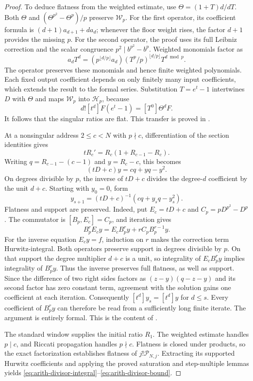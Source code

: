\begin{proof}
To deduce flatness from the weighted estimate, use
$\Theta=(1+T)d/dT$.  Both $\Theta$ and
$(\Theta^{p^2}-\Theta^p)/p$ preserve $\mathcal W_p$.
For the first operator, its coefficient formula is
$(d+1)a_{d+1}+da_d$; whenever the floor weight rises, the factor $d+1$
provides the missing $p$.  For the second operator, the proof uses its
full Leibniz correction and the scalar congruence
$p^2\mid b^{p^2}-b^p$.  Weighted monomials factor as
\[
 a_dT^d=(p^{\lfloor d/p\rfloor}a_d)
          (T^p/p)^{\lfloor d/p\rfloor}T^{d\bmod p}.
\]
The operator preserves these monomials and hence finite weighted
polynomials.  Each fixed output coefficient depends on only finitely many
input coefficients, which extends the result to the formal series.
Substitution $T=e^t-1$ intertwines $D$ with $\Theta$ and maps
$\mathcal W_p$ into $\mathcal H_p$, because
\[
 d![t^d]F(e^t-1)=[T^0]\Theta^dF.
\]
It follows that the singular ratios are flat.  This transfer is proved in
.

At a nonsingular address $2\le c<N$ with $p\nmid c$, differentiation of the section
identities gives
\[
 tR_c'=R_c(1+R_{c-1}-R_c).
\]
Writing $q=R_{c-1}-(c-1)$ and $y=R_c-c$, this becomes
\[
 (tD+c)y=cq+yq-y^2.
\]
On degrees divisible by $p$, the inverse of $tD+c$ divides the degree-$d$
coefficient by the unit $d+c$.  Starting with $y_0=0$, form
\[
 y_{s+1}=(tD+c)^{-1}(cq+y_sq-y_s^2).
\]
Flatness and support are preserved. Indeed, put $E_c=tD+c$ and $C_p=pD^{p^2}-D^p$.
The commutator is $[B_p,E_c]=C_p$, and iteration gives
\[
 B_p^rE_cy=E_cB_p^ry+rC_pB_p^{r-1}y.
\]
For the inverse equation $E_cy=f$, induction on $r$ makes the
correction term Hurwitz-integral. Both operators preserve support in
degrees divisible by $p$. On that support the degree multiplier $d+c$
is a unit, so integrality of $E_cB_p^ry$ implies integrality of
$B_p^ry$. Thus the inverse preserves full flatness, as well as support.
 Since the difference of two right
sides factors as $(z-y)(q-z-y)$ and its second factor has zero constant
term, agreement with the solution gains one coefficient at each iteration.
Consequently $[t^d]y_s=[t^d]y$ for $d\le s$.
Every coefficient of $B_p^r y$ can therefore be read from a sufficiently
long finite iterate.  The argument is entirely formal.
This is the content of
.

The standard window supplies the initial ratio $R_1$.  The weighted
estimate handles $p\mid c$, and Riccati propagation handles $p\nmid c$.
Flatness is closed under products, so the exact factorization establishes
flatness of $j!\mathcal P_{N,j}$.  Extracting its supported Hurwitz coefficients
and applying the proved saturation and step-multiple lemmas yields
\eqref{eq:arith-divisor-integral}--\eqref{eq:arith-divisor-bound}.


\end{proof}
